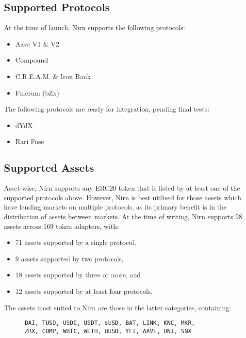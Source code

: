\documentclass{article}
\begin{document}
\newpage
\subsection{Supported Protocols}

At the time of launch, Nirn supports the following protocols:

\begin{itemize}
\item Aave V1 \& V2~\cite{aave}
\item Compound~\cite{compound}
\item C.R.E.A.M. \& Iron Bank~\cite{cream}
\item Fulcrum (bZx)~\cite{bZx}
\end{itemize}

\noindent
The following protocols are ready for integration, pending final tests:

\begin{itemize}
\item dYdX~\cite{dYdX}
\item Rari Fuse~\cite{rari}
\end{itemize}

\subsection{Supported Assets}

Asset-wise, Nirn supports any ERC20 token that is listed by at least one of the supported protocols above. However, Nirn is best utilised for those assets which have lending markets on multiple protocols, as its primary benefit is in the distribution of assets between markets. At the time of writing, Nirn supports 98 assets across 169 token adapters, with:

\begin{itemize}
    \item 71 assets supported by a single protocol,
    \item 9 assets supported by two protocols,
    \item 18 assets supported by three or more, and
    \item 12 assets supported by at least four protocols.
\end{itemize}

\noindent
The assets most suited to Nirn are those in the latter categories, containing:

\begin{verbatim}
      DAI, TUSD, USDC, USDT, sUSD, BAT, LINK, KNC, MKR,
      ZRX, COMP, WBTC, WETH, BUSD, YFI, AAVE, UNI, SNX
\end{verbatim}
\end{document}
